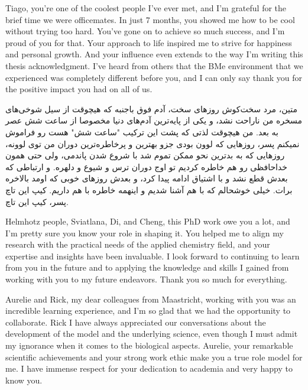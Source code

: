 Tiago, you're one of the coolest people I've ever met, and I'm grateful for the brief time we were officemates. In just 7 months, you showed me how to be cool without trying too hard. You've gone on to achieve so much success, and I'm proud of you for that. Your approach to life inspired me to strive for happiness and personal growth. And your influence even extends to the way I'm writing this thesis acknowledgment. I've heard from others that the BMe environment that we experienced was completely different before you, and I can only say thank you for the positive impact you had on all of us.

\begin{flushright}
\foreignlanguage{persian}
{
متین، مرد سخت‌کوش روزهای سخت، آدم فوق باجنبه که هیچوقت از سیل شوخی‌های مسخره من ناراحت نشد، و یکی از پایه‌ترین آدم‌های دنیا مخصوصا از ساعت شش عصر به بعد. من هیچوقت لذتی که پشت این ترکیب "ساعت شش" هست رو فراموش نمیکنم پسر، روزهایی که لوون بودی جزو بهترین و پرخاطره‌ترین دوران من توی لوونه، روزهایی که به بدترین نحو ممکن تموم شد با شروع شدن پاندمی، ولی حتی همون خداحافظی رو هم خاطره کردیم تو اوج دوران ترس و شیوع و دلهره. و ارتباطی که بعدش قطع نشد و با اشتیاق ادامه پیدا کرد، و بعدش روزهای خوبی که اومد بالاخره برات. خیلی خوشحالم که با هم آشنا شدیم و اینهمه خاطره با هم داریم. کیپ این تاچ پسر، کیپ این تاچ.
}
\end{flushright}

\newpage

Helmhotz people, Sviatlana, Di, and Cheng, this PhD work owe you a lot, and I'm pretty sure you know your role in shaping it. You helped me to align my research with the practical needs of the applied chemistry field, and your expertise and insights have been invaluable. I look forward to continuing to learn from you in the future and to applying the knowledge and skills I gained from working with you to my future endeavors. Thank you so much for everything.

Aurelie and Rick, my dear colleagues from Maastricht, working with you was an incredible learning experience, and I'm so glad that we had the opportunity to collaborate. Rick I have always appreciated our conversations about the development of the model and the underlying science, even though I must admit my ignorance when it comes to the biological aspects. Aurelie, your remarkable scientific achievements and your strong work ethic make you a true role model for me. I have immense respect for your dedication to academia and very happy to know you.

